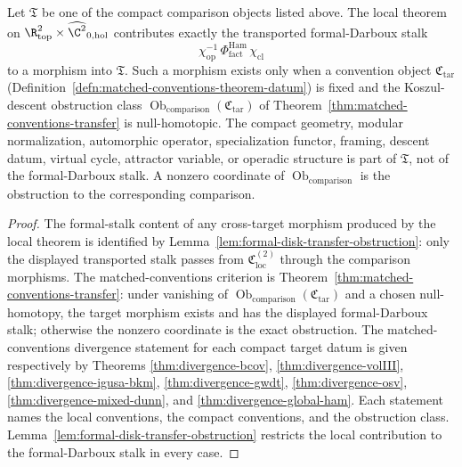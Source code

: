 \begin{thm}\label{thm:cross-target-restriction}
  Let \(\mathfrak T\) be one of the compact comparison objects listed
  above.  The local theorem on
  \(\R^2_{\mathrm{top}}\times\widehat{\C^2}_{0,\mathrm{hol}}\)
  contributes exactly the transported formal-Darboux stalk
  \[
    \chi_{\mathrm{op}}^{-1}\,
    \Phi^{\mathrm{Ham}}_{\mathrm{fact}}\,
    \chi_{\mathrm{cl}}
  \]
  to a morphism into \(\mathfrak T\).  Such a morphism exists only when
  a convention object \(\mathfrak C_{\mathrm{tar}}\)
  (Definition~\ref{defn:matched-conventions-theorem-datum}) is fixed and
  the Koszul-descent obstruction class
  \(\operatorname{Ob}_{\mathrm{comparison}}(\mathfrak C_{\mathrm{tar}})\) of
  Theorem~\ref{thm:matched-conventions-transfer} is null-homotopic.
  The compact geometry, modular normalization, automorphic operator,
  specialization functor, framing, descent datum, virtual cycle,
  attractor variable, or operadic structure is part of
  \(\mathfrak T\), not of the formal-Darboux stalk.  A
  nonzero coordinate of
  \(\operatorname{Ob}_{\mathrm{comparison}}\) is the obstruction to the
  corresponding comparison.
\end{thm}

\begin{proof}
  The formal-stalk content of any cross-target morphism produced by
  the local theorem is identified by
  Lemma~\ref{lem:formal-disk-transfer-obstruction}: only the displayed
  transported stalk passes from \(\mathfrak C_{\mathrm{loc}}^{(2)}\)
  through the comparison morphisms.  The matched-conventions
  criterion is
  Theorem~\ref{thm:matched-conventions-transfer}: under vanishing of
  \(\operatorname{Ob}_{\mathrm{comparison}}(\mathfrak C_{\mathrm{tar}})\)
  and a chosen null-homotopy, the target morphism exists and has the
  displayed formal-Darboux stalk; otherwise the nonzero coordinate is the
  exact obstruction.  The matched-conventions divergence statement for
  each compact target datum is given respectively by
  Theorems \ref{thm:divergence-bcov},
  \ref{thm:divergence-volIII},
  \ref{thm:divergence-igusa-bkm},
  \ref{thm:divergence-gwdt},
  \ref{thm:divergence-osv},
  \ref{thm:divergence-mixed-dunn}, and
  \ref{thm:divergence-global-ham}.  Each statement names the local
  conventions, the compact conventions, and the obstruction
  class.  Lemma~\ref{lem:formal-disk-transfer-obstruction} restricts
  the local contribution to the formal-Darboux stalk in every case.
\end{proof}

